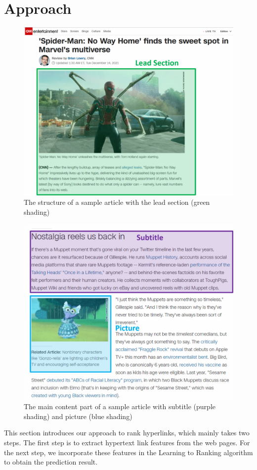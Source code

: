 \section{Approach} \label{sec_approach}

\begin{figure}[t]
\centering
\includegraphics[width=0.8\columnwidth]{vis_example1}
\caption{The structure of a sample article with the lead section (green shading)}
\label{vis_example1}
\end{figure}


\begin{figure}[t]
\centering
\includegraphics[width=0.8\columnwidth]{vis_example2}
\caption{The main content part of a sample article with subtitle (purple shading) and picture (blue shading)}
\label{vis_example2}
\end{figure}

This section introduces our approach to rank hyperlinks, which mainly takes two steps. The first step is to extract hypertext link features from the web pages. For the next step, we incorporate these features in the Learning to Ranking algorithm to obtain the prediction result.

